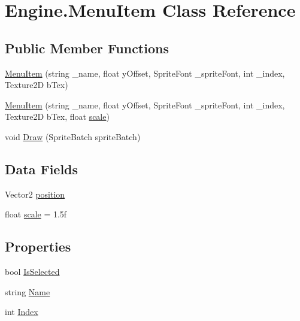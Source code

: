 \hypertarget{a00578}{}\section{Engine.\+Menu\+Item Class Reference}
\label{a00578}
\subsection*{Public Member Functions}
\begin{DoxyCompactItemize}
\item 
\hyperlink{a00578_af8c1e0084202dd6048beb56c3e8ea1eb}{Menu\+Item} (string \+\_\+name, float y\+Offset, Sprite\+Font \+\_\+sprite\+Font, int \+\_\+index, Texture2D b\+Tex)
\item 
\hyperlink{a00578_a79a905f74d6632e0c8cda3cd951072a2}{Menu\+Item} (string \+\_\+name, float y\+Offset, Sprite\+Font \+\_\+sprite\+Font, int \+\_\+index, Texture2D b\+Tex, float \hyperlink{a00578_a8f2bf7f4310e299f7ef8ff70729c3aff}{scale})
\item 
void \hyperlink{a00578_afdc8061ebe0db94ec3c73c3648f35c27}{Draw} (Sprite\+Batch sprite\+Batch)
\end{DoxyCompactItemize}
\subsection*{Data Fields}
\begin{DoxyCompactItemize}
\item 
Vector2 \hyperlink{a00578_a45b562c09b4b905b48941cc5723265af}{position}
\item 
float \hyperlink{a00578_a8f2bf7f4310e299f7ef8ff70729c3aff}{scale} = 1.\+5f
\end{DoxyCompactItemize}
\subsection*{Properties}
\begin{DoxyCompactItemize}
\item 
bool \hyperlink{a00578_a7455f6df46a7eb219f4c03c7f311fec2}{Is\+Selected}
\item 
string \hyperlink{a00578_abf3d8b83686d4378d2bb2d5cc2ccbf5a}{Name}
\item 
int \hyperlink{a00578_a7bef8d2c1b94b0edf19a89cf76269442}{Index}
\end{DoxyCompactItemize}


